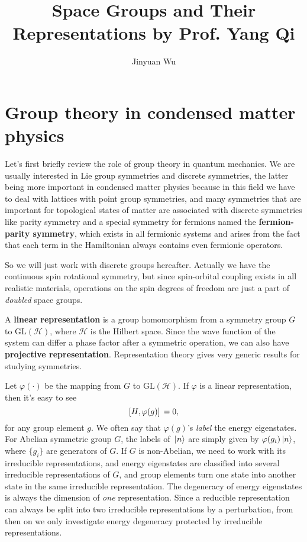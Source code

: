 \documentclass[hyperref, a4paper]{article}
\title{Space Groups and Their Representations by Prof. Yang Qi}
\author{Jinyuan Wu}
\newcommand*{\concept}[1]{{\textbf{#1}}}
\begin{document}
\maketitle

\section{Group theory in condensed matter physics}

Let's first briefly review the role of group theory in quantum mechanics.
We are usually interested in Lie group symmetries and discrete symmetries, the latter being more important in 
condensed matter physics because in this field we have to deal with lattices with point group symmetries, 
and many symmetries that are important for topological states of matter are associated with discrete symmetries 
like parity symmetry and a special symmetry for fermions named the \concept{fermion-parity symmetry}, which 
exists in all fermionic systems and arises from the fact that each term in the Hamiltonian always contains 
even fermionic operators.

So we will just work with discrete groups hereafter. Actually we have the continuous spin rotational symmetry,
but since spin-orbital coupling exists in all realistic materials, operations on the spin degrees of freedom 
are just a part of \emph{doubled} space groups.

A \concept{linear representation} is a group homomorphism from a symmetry group $G$ to $\mathrm{GL}(\mathcal{H})$,
where $\mathcal{H}$ is the Hilbert space. Since the wave function of the system can differ a phase factor 
after a symmetric operation, we can also have \concept{projective representation}. 
Representation theory gives very generic results for studying symmetries.

Let $\varphi(\cdot)$ be the mapping from $G$ to $\mathrm{GL}(\mathcal{H})$. If $\varphi$ is a linear representation,
then it's easy to see 
\begin{equation}
    \comm*{H}{\varphi(g)} = 0,
\end{equation}
for any group element $g$. We often say that $\varphi(g)$'s \emph{label} the energy eigenstates. 
For Abelian symmetric group $G$, the labels of $\ket*{n}$ are simply given by $\varphi(g_i) \ket*{n}$, where $\{g_i\}$ 
are generators of $G$. If $G$ is non-Abelian, we need to work with its irreducible representations, and 
energy eigenstates are classified into several irreducible representations of $G$, and group elements turn one 
state into another state in the same irreducible representation. The degeneracy of energy eigenstates is 
always the dimension of \emph{one} representation. Since a reducible representation can always be split into 
two irreducible representations by a perturbation, from then on we only investigate energy degeneracy protected 
by irreducible representations.
\end{document}
